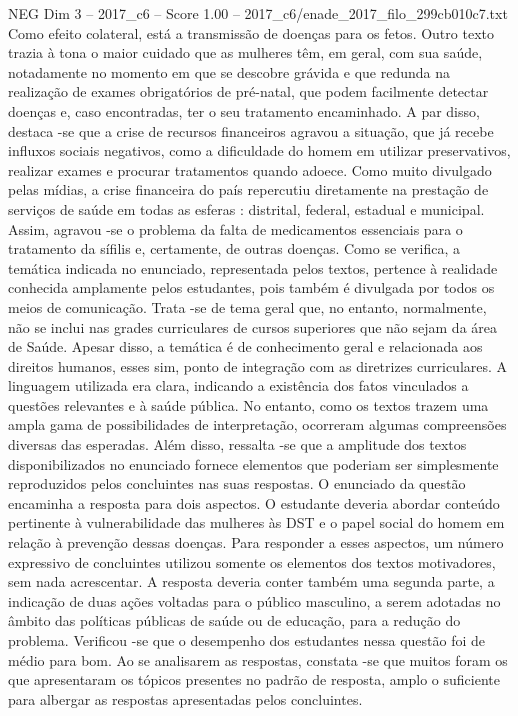 \begin{textsample}{NEG Dim 3 – 2017\_c6 – Score 1.00 – 2017\_c6/enade\_2017\_filo\_299cb010c7.txt}
Como efeito colateral, está a transmissão de doenças para os fetos.
Outro texto trazia à tona o maior cuidado que as mulheres têm, em geral, com sua saúde, notadamente no momento em que se descobre grávida e que redunda na realização de exames obrigatórios de pré-natal, que podem facilmente detectar doenças e, caso encontradas, ter o seu tratamento encaminhado.
A par disso, destaca -se que a crise de recursos financeiros agravou a situação, que já recebe influxos sociais negativos, como a dificuldade do homem em utilizar preservativos, realizar exames e procurar tratamentos quando adoece.
Como muito divulgado pelas mídias, a crise financeira do país repercutiu diretamente na prestação de serviços de saúde em todas as esferas : distrital, federal, estadual e municipal.
Assim, agravou -se o problema da falta de medicamentos essenciais para o tratamento da sífilis e, certamente, de outras doenças.
Como se verifica, a temática indicada no enunciado, representada pelos textos, pertence à realidade conhecida amplamente pelos estudantes, pois também é divulgada por todos os meios de comunicação.
Trata -se de tema geral que, no entanto, normalmente, não se inclui nas grades curriculares de cursos superiores que não sejam da área de Saúde.
Apesar disso, a temática é de conhecimento geral e relacionada aos direitos humanos, esses sim, ponto de integração com as diretrizes curriculares.
A linguagem utilizada era clara, indicando a existência dos fatos vinculados a questões relevantes e à saúde pública.
No entanto, como os textos trazem uma ampla gama de possibilidades de interpretação, ocorreram algumas compreensões diversas das esperadas.
Além disso, ressalta -se que a amplitude dos textos disponibilizados no enunciado fornece elementos que poderiam ser simplesmente reproduzidos pelos concluintes nas suas respostas.
O enunciado da questão encaminha a resposta para dois aspectos.
O estudante deveria abordar conteúdo pertinente à vulnerabilidade das mulheres às DST e o papel social do homem em relação à prevenção dessas doenças.
Para responder a esses aspectos, um número expressivo de concluintes utilizou somente os elementos dos textos motivadores, sem nada acrescentar.
A resposta deveria conter também uma segunda parte, a indicação de duas ações voltadas para o público masculino, a serem adotadas no âmbito das políticas públicas de saúde ou de educação, para a redução do problema.
Verificou -se que o desempenho dos estudantes nessa questão foi de médio para bom.
Ao se analisarem as respostas, constata -se que muitos foram os que apresentaram os tópicos presentes no padrão de resposta, amplo o suficiente para albergar as respostas apresentadas pelos concluintes.

\end{textsample}
